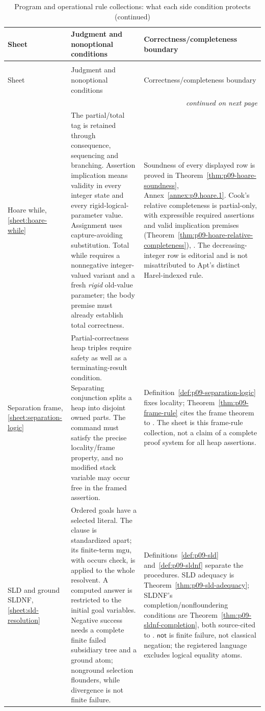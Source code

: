 \begingroup\small
\begin{longtable}{@{}p{.17\linewidth}p{.39\linewidth}p{.36\linewidth}@{}}
\caption{Program and operational rule collections: what each side condition protects.}
\label{tab:p14-nonclassical-programs}\\
\toprule
Sheet & Judgment and nonoptional conditions & Correctness/completeness boundary \\
\midrule\endfirsthead
\caption[]{Program and operational rule collections: what each side condition protects (continued)}\\
\toprule Sheet & Judgment and nonoptional conditions & Correctness/completeness boundary \\
\midrule\endhead
\midrule\multicolumn{3}{r}{\emph{continued on next page}}\\
\endfoot
\endlastfoot
Hoare while, \ref{sheet:hoare-while} & The partial/total tag is retained
through consequence, sequencing and branching. Assertion implication means
validity in every integer state and every rigid-logical-parameter value.
Assignment uses capture-avoiding substitution. Total while requires a
nonnegative integer-valued variant and a fresh \emph{rigid} old-value
parameter; the body premise must already establish total correctness. &
Soundness of every displayed row is proved in
Theorem~\ref{thm:p09-hoare-soundness}, Annex~\ref{annex:p9.hoare.1}.
Cook's relative completeness is partial-only, with expressible required
assertions and valid implication premises
(Theorem~\ref{thm:p09-hoare-relative-completeness}), \cite{Cook1978}.
The decreasing-integer row is editorial and is not misattributed to
Apt's distinct Harel-indexed rule. \\
\addlinespace
Separation frame, \ref{sheet:separation-logic} & Partial-correctness heap
triples require safety as well as a terminating-result condition.
Separating conjunction splits a heap into disjoint owned parts. The command
must satisfy the precise locality/frame property, and no modified stack
variable may occur free in the framed assertion. &
Definition~\ref{def:p09-separation-logic} fixes locality;
Theorem~\ref{thm:p09-frame-rule} cites the frame theorem to
\cite{OHearnReynoldsYang2001}. The sheet is this frame-rule collection,
not a claim of a complete proof system for all heap assertions. \\
\addlinespace
SLD and ground SLDNF, \ref{sheet:sld-resolution} & Ordered goals have a
selected literal. The clause is standardized apart; its finite-term mgu,
with occurs check, is applied to the whole resolvent. A computed answer is
restricted to the initial goal variables. Negative success needs a complete
finite failed subsidiary tree and a ground atom; nonground selection
flounders, while divergence is not finite failure. &
Definitions~\ref{def:p09-sld} and~\ref{def:p09-sldnf} separate the
procedures. SLD adequacy is Theorem~\ref{thm:p09-sld-adequacy}; SLDNF's
completion/nonfloundering conditions are
Theorem~\ref{thm:p09-sldnf-completion}, both source-cited to
\cite{Lloyd1987}. \(\mathsf{not}\) is finite failure, not classical
negation; the registered language excludes logical equality atoms. \\
\bottomrule
\end{longtable}\endgroup

